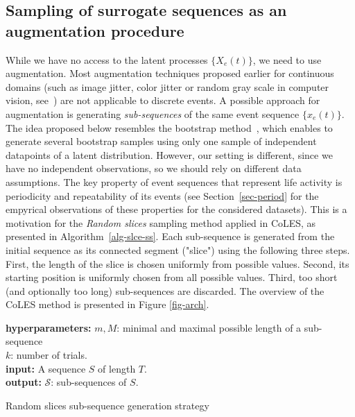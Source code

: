 \documentclass[sigconf, anonymous]{acmart}
\begin{document}
\subsection{Sampling of surrogate sequences as an augmentation procedure} \label{sec-pos-pairs}

While we have no access to the latent processes $\{X_e(t)\}$, we need to use augmentation. Most augmentation techniques proposed earlier for continuous domains (such as image jitter, color jitter or random gray scale in computer vision, see~\citep{Falcon2020AFF}) are not applicable to discrete events. A possible approach for augmentation is generating
{\it sub-sequences} of the same event sequence $\{x_e(t)\}$. The idea proposed below resembles the bootstrap method~\citep{Efron1994Bootstrap}, which enables to generate several bootstrap samples using only one sample of independent datapoints of a latent distribution. However, our setting is different, since we have no independent observations, so we should rely on different data assumptions. 
The key property of event sequences that represent life activity is periodicity and repeatability of its events (see Section~\ref{sec-period} for the empyrical observations of these properties for the considered datasets). This is a motivation for the \textit{Random slices} sampling method applied in CoLES, as presented in Algorithm~\ref{alg-slce-ss}. Each sub-sequence is generated from the initial sequence as its connected segment ("slice") using the following three steps. First, the length of the slice is chosen uniformly from possible values. Second, its starting position is uniformly chosen from all possible values. Third, too short (and optionally too long) sub-sequences are discarded.
The overview of the CoLES method is presented in Figure \ref{fig-arch}.

\begin{algorithm}
\SetAlgoLined
\textbf{hyperparameters:} $m, M$: minimal and maximal possible length of a sub-sequence\\ $k$: number of trials.\\ %
\textbf{input:} A sequence $S$ of length $T$. \\
\textbf{output:} $\mathcal{S}$: sub-sequences of $S$. \\

\BlankLine
\caption{Random slices sub-sequence generation strategy}
\label{alg-slce-ss}
\end{algorithm}
\end{document}
